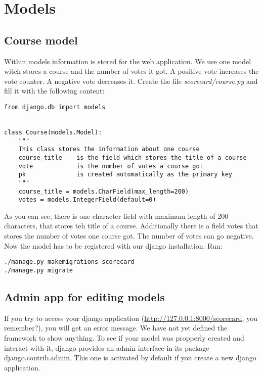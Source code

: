 \section{Models}

\subsection{Course model}
Within models information is stored for the web application. We use one model witch stores a course and the number of votes it got. A positive vote increases the vote counter. A negative vote decreases it. Create the file \emph{scorecard/course.py} and fill it with the following content:

\begin{lstlisting}[style=Python, caption=scorecard/models.py, label=lst:models.py]
from django.db import models


class Course(models.Model):
    """
    This class stores the information about one course
    course_title    is the field which stores the title of a course
    vote            is the number of votes a course got
    pk              is created automatically as the primary key
    """
    course_title = models.CharField(max_length=200)
    votes = models.IntegerField(default=0)
\end{lstlisting}

As you can see, there is one character field with maximum length of 200 characters, that stores teh title of a course. Additionally there is a field votes that stores the number of votes one course got. The number of votes can go negative. Now the model has to be registered with our django installation. Run:
\begin{lstlisting}[style=Bash, caption=Register models, label=lst:register_models]
./manage.py makemigrations scorecard
./manage.py migrate
\end{lstlisting}

\subsection{Admin app for editing models}
If you try to access your django application (\url{http://127.0.0.1:8000/scorecard}, you remember?), you will get an error message. We have not yet defined the framework to show anything. To see if your model was propperly created and interact with it, django provides an admin interface in its package django.contrib.admin. This one is activated by default if you create a new django application.

